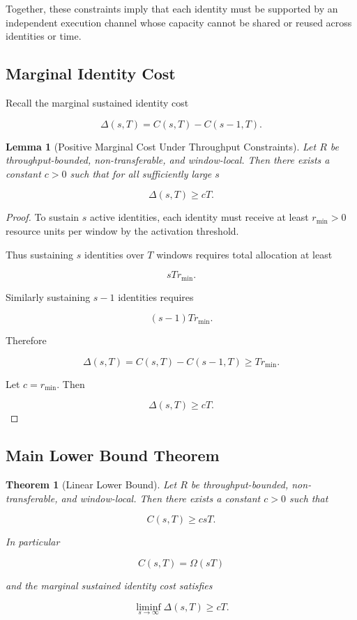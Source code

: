 \documentclass[journal]{IEEEtran}
\newtheorem{theorem}{Theorem}
\newtheorem{lemma}{Lemma}
\begin{document}
	Together, these constraints imply that each identity
	must be supported by an independent execution channel
	whose capacity cannot be shared or reused across identities
	or time.
	
	\subsection{Marginal Identity Cost}
	
	Recall the marginal sustained identity cost
	
	\[
	\Delta(s,T) = C(s,T) - C(s-1,T).
	\]
	
	\begin{lemma}[Positive Marginal Cost Under Throughput Constraints]
		
		Let $R$ be throughput-bounded, non-transferable,
		and window-local.
		Then there exists a constant $c>0$ such that
		for all sufficiently large $s$
		
		\[
		\Delta(s,T) \ge cT .
		\]
		
	\end{lemma}
	
	\begin{proof}
		
		To sustain $s$ active identities,
		each identity must receive at least $r_{\min}>0$
		resource units per window by the activation threshold.
		
		Thus sustaining $s$ identities over $T$ windows
		requires total allocation at least
		
		\[
		sT r_{\min}.
		\]
		
		Similarly sustaining $s-1$ identities requires
		
		\[
		(s-1)T r_{\min}.
		\]
		
		Therefore
		
		\[
		\Delta(s,T)
		=
		C(s,T)-C(s-1,T)
		\ge
		T r_{\min}.
		\]
		
		Let $c = r_{\min}$.
		Then
		
		\[
		\Delta(s,T) \ge cT .
		\]
		
	\end{proof}
	
	\subsection{Main Lower Bound Theorem}
	
	\begin{theorem}[Linear Lower Bound]
		
		Let $R$ be throughput-bounded, non-transferable,
		and window-local.
		Then there exists a constant $c>0$ such that
		
		\[
		C(s,T) \ge c sT .
		\]
		
		In particular
		
		\[
		C(s,T) = \Omega(sT)
		\]
		
		and the marginal sustained identity cost satisfies
		
		\[
		\liminf_{s\to\infty}\Delta(s,T) \ge cT .
		\]
		
	\end{theorem}
	
\end{document}

